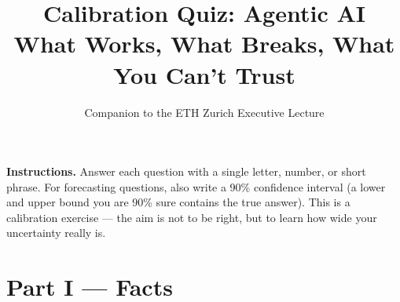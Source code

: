 \documentclass[11pt,a4paper]{article}
\title{Calibration Quiz: Agentic AI\\[0.2em]
       \large What Works, What Breaks, What You Can't Trust}
\author{Companion to the ETH Zurich Executive Lecture}
\date{}
\begin{document}
\maketitle

\noindent\textbf{Instructions.}
Answer each question with a single letter, number, or short phrase.
For forecasting questions, also write a 90\% confidence interval
(a lower and upper bound you are 90\% sure contains the true answer).
This is a calibration exercise --- the aim is not to be right, but
to learn how wide your uncertainty really is.

\vspace{1em}

\section*{Part I --- Facts}
\end{document}
